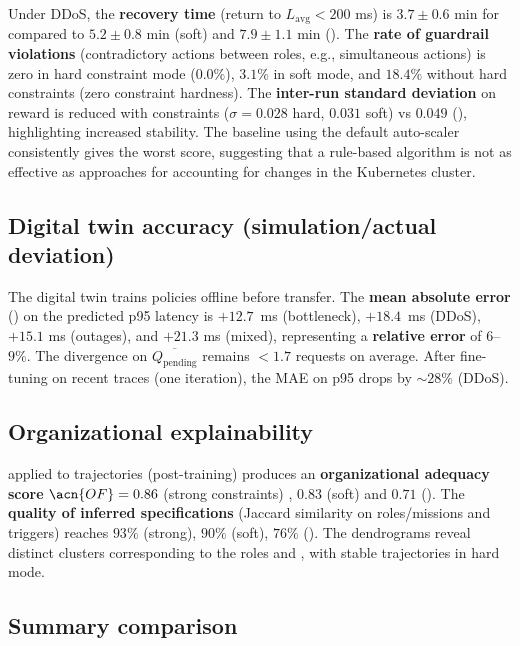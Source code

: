   Under DDoS, the \textbf{recovery time} (return to $L_{\text{avg}}<200$ ms) is $3.7 \pm 0.6$ min for  compared to $5.2 \pm 0.8$ min (soft) and $7.9 \pm 1.1$ min ().
  The \textbf{rate of guardrail violations} (contradictory actions between roles, e.g., simultaneous  actions) is zero in hard constraint mode ($0.0\%$), $3.1\%$ in soft mode, and $18.4\%$ without hard constraints (zero constraint hardness).
  The \textbf{inter-run standard deviation} on reward is reduced with constraints ($\sigma=0.028$ hard, $0.031$ soft) vs $0.049$ (), highlighting increased stability. The baseline using the default auto-scaler  consistently gives the worst score, suggesting that a rule-based algorithm is not as effective as  approaches for accounting for changes in the Kubernetes cluster.

  \subsection* {Digital twin accuracy (simulation/actual deviation)}

  The digital twin trains policies offline before transfer.
  The \textbf{mean absolute error} () on the predicted p95 latency is $+12.7$~ms (bottleneck), $+18.4$~ms (DDoS), $+15.1$ ms (outages), and $+21.3$ ms (mixed), representing a \textbf{relative error} of $6$–$9\% $.
  The divergence on $\overline{Q_{\text{pending}}}$ remains $<1.7$ requests on average.
  After fine-tuning on recent traces (one iteration), the MAE on p95 drops by $\sim 28\%$ (DDoS).

  \subsection*{Organizational explainability}

   applied to trajectories (post-training) produces an \textbf{organizational adequacy score} $\acn{OF}=0.86$ (strong constraints) , $0.83$ (soft) and $0.71$ ().
  The \textbf{quality of inferred specifications} (Jaccard similarity on roles/missions and triggers) reaches $93\%$ (strong), $90\%$ (soft), $76\%$ ().
  The dendrograms reveal distinct clusters corresponding to the roles  and , with stable trajectories in hard mode.

  \subsection*{Summary comparison}

